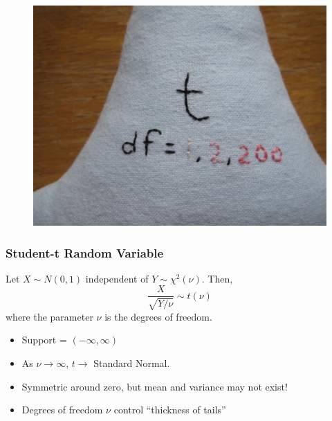 \documentclass[handout]{beamer}
\begin{document}
\begin{frame}
\begin{figure}
\includegraphics[scale = 0.2]{./images/t_etsy2}
\end{figure}
\end{frame}


\begin{frame}
\frametitle{Student-t Random Variable}
Let $X \sim N(0,1)$ independent of $Y \sim \chi^2(\nu)$. Then,
$$\frac{X}{\sqrt{Y/\nu}}\sim t(\nu)$$
where the parameter $\nu$ is the degrees of freedom.

\pause

\begin{itemize}
	\item Support = $(-\infty, \infty)$
	\item As $\nu \rightarrow \infty$, $t \rightarrow$ Standard Normal.
	\item Symmetric around zero, but mean and variance may not exist!
	\item Degrees of freedom $\nu$ control ``thickness of tails''
\end{itemize}
\vspace{1em}


\end{frame}
\end{document}
